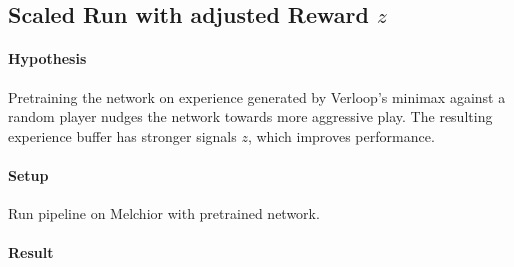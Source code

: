 \subsection{Scaled Run with adjusted Reward $z$}
\paragraph{Hypothesis} Pretraining the network on experience generated by Verloop's minimax against a random player nudges the network towards more aggressive play. The resulting experience buffer has stronger signals $z$, which improves performance.
\paragraph{Setup} Run pipeline on Melchior with pretrained network.
\paragraph{Result}
\begin{figure}[!h]
    \centering
    \hfill
    \caption{}
    \label{performance_remote_diff_z}
\end{figure}